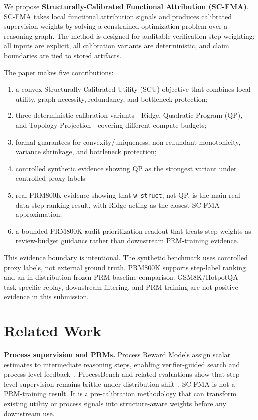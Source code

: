 \documentclass[a4paper,fleqn]{cas-sc}
\begin{document}
We propose \textbf{Structurally-Calibrated Functional Attribution (SC-FMA)}. SC-FMA takes local functional attribution signals and produces calibrated supervision weights by solving a constrained optimization problem over a reasoning graph. The method is designed for auditable verification-step weighting: all inputs are explicit, all calibration variants are deterministic, and claim boundaries are tied to stored artifacts.

The paper makes five contributions:
\begin{enumerate}
\item a convex Structurally-Calibrated Utility (SCU) objective that combines local utility, graph necessity, redundancy, and bottleneck protection;
\item three deterministic calibration variants---Ridge, Quadratic Program (QP), and Topology Projection---covering different compute budgets;
\item formal guarantees for convexity/uniqueness, non-redundant monotonicity, variance shrinkage, and bottleneck protection;
\item controlled synthetic evidence showing QP as the strongest variant under controlled proxy labels;
\item real PRM800K evidence showing that \texttt{w\_struct}, not QP, is the main real-data step-ranking result, with Ridge acting as the closest SC-FMA approximation;
\item a bounded PRM800K audit-prioritization readout that treats step weights as review-budget guidance rather than downstream PRM-training evidence.
\end{enumerate}

This evidence boundary is intentional. The synthetic benchmark uses controlled proxy labels, not external ground truth. PRM800K supports step-label ranking and an in-distribution frozen PRM baseline comparison. GSM8K/HotpotQA task-specific replay, downstream filtering, and PRM training are not positive evidence in this submission.

\section{Related Work}

\textbf{Process supervision and PRMs.} Process Reward Models assign scalar estimates to intermediate reasoning steps, enabling verifier-guided search and process-level feedback~\citep{lightman2023verify,wang2024mathshepherd}. ProcessBench and related evaluations show that step-level supervision remains brittle under distribution shift~\citep{zheng2024processbench}. SC-FMA is not a PRM-training result. It is a pre-calibration methodology that can transform existing utility or process signals into structure-aware weights before any downstream use.
\end{document}

